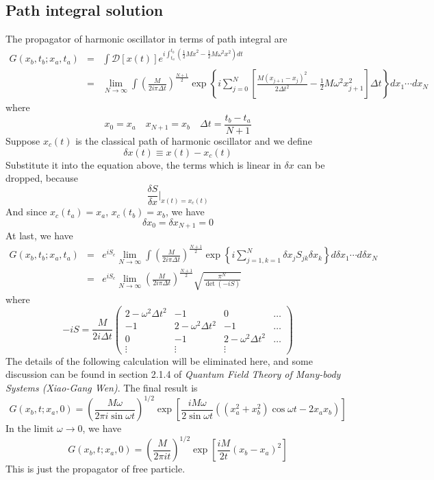 \subsection{Path integral solution}
The propagator of harmonic oscillator in terms of path integral are
\begin{eqnarray}
G(x_b,t_b;x_a,t_a) &=& \int \mathcal{D}[x(t)] e^{i\int_{t_a}^{t_b} (\frac{1}{2}M\dot{x}^2 - \frac{1}{2}M\omega^2 x^2)dt} \nonumber \\
&=& \lim_{N \to \infty} \int \left(\frac{M}{2i\pi\Delta t}\right)^{\frac{N+1}{2}} \exp \left\{ i \sum_{j=0}^{N}\left[ \frac{M(x_{j+1}-x_{j})^2}{2\Delta t^2}   - \frac{1}{2}M\omega^2 x_{j+1}^2 \right] \Delta t \right\} dx_1 \cdots dx_N \nonumber
\end{eqnarray}
where
\[x_0 = x_a \quad x_{N+1} = x_b \quad \Delta t = \frac{t_b-t_a}{N+1}\]
Suppose $x_c(t)$ is the classical path of harmonic oscillator and we define
\[\delta x(t) \equiv x(t) - x_c(t)\]
Substitute it into the equation above, the terms which is linear in $\delta x$ can be dropped, because
\[\frac{\delta S}{\delta x} |_{x(t) = x_c(t)}\]
And since $x_c(t_a) = x_a$, $x_c(t_b) = x_b$, we have
\[\delta x_{0} = \delta x_{N+1} = 0\]
At last, we have
\begin{eqnarray}
G(x_b,t_b;x_a,t_a) &=& e^{iS_c} \lim_{N \to \infty} \int \left(\frac{M}{2i\pi\Delta t}\right)^{\frac{N+1}{2}} \exp \left\{ i \sum_{j=1,k=1}^{N} \delta x_j S_{jk} \delta x_k\right\} d\delta x_1 \cdots d\delta x_N \nonumber \\
&=& e^{iS_c} \lim_{N \to \infty} \left(\frac{M}{2i\pi\Delta t}\right)^{\frac{N+1}{2}} \sqrt{\frac{\pi^N}{\det (-iS)}}
\end{eqnarray}
where
\[-iS = \frac{M}{2i\Delta t} \left( \begin{matrix} 2-\omega^2\Delta t^2 & -1& 0& \ldots \\ -1& 2-\omega^2\Delta t^2& -1& \ldots \\ 0& -1& 2-\omega^2\Delta t^2& \ldots \\ \vdots & \vdots & \vdots & \end{matrix} \right)\]
The details of the following calculation will be eliminated here, and some discussion can be found in section 2.1.4 of \emph{Quantum Field Theory of Many-body Systems (Xiao-Gang Wen)}. The final result is\\
\[G(x_b,t;x_a,0) = \left ( \frac{M\omega}{2\pi i \sin \omega t} \right )^{1/2}\exp \left [ \frac{iM\omega}{2\sin\omega t} \left ((x_a^2 + x_b^2)\cos\omega t - 2x_a x_b  \right ) \right ]\]
In the limit $\omega \to 0$, we have
\[G(x_b,t;x_a,0) = \left ( \frac{M}{2\pi i t} \right )^{1/2}\exp \left [ \frac{iM}{2t} \left ( x_b-x_a\right)^2 \right ]\]
This is just the propagator of free particle.

